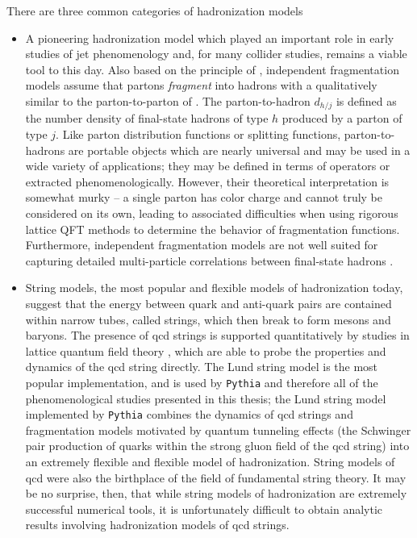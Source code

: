 \begin{subappendices}
There are three common categories of hadronization models
\begin{itemize}
    \item

        A pioneering hadronization model which played an important role in early studies of jet phenomenology and, for many collider studies, remains a viable tool to this day.
        Also based on the principle of , independent fragmentation models assume that partons \textit{fragment} into hadrons with a  qualitatively similar to the \gls{parton-to-parton} of  \cite{Collins:2023cuo,Collins:2011zzd}.
        The \gls{parton-to-hadron} \(d_{h/j}\) is defined as the number density of final-state hadrons of type \(h\) produced by a parton of type \(j\).
        Like parton distribution functions or splitting functions, \glspl{parton-to-hadron} are portable objects which are nearly universal and may be used in a wide variety of applications;
        they may be defined in terms of operators or extracted phenomenologically.
        However, their theoretical interpretation is somewhat murky -- a single parton has color charge and cannot truly be considered on its own, leading to associated difficulties when using rigorous lattice QFT methods to determine the behavior of fragmentation functions.
        Furthermore, independent fragmentation models are not well suited for capturing detailed multi-particle correlations between final-state hadrons \cite{}.


    \item

        String models, the most popular and flexible models of hadronization today, suggest that the energy between quark and anti-quark pairs are contained within narrow tubes, called strings, which then break to form mesons and baryons.
        The presence of \gls{qcd} strings is supported quantitatively by studies in lattice quantum field theory \cite{}, which are able to probe the properties and dynamics of the \gls{qcd} string directly.
        The Lund string model is the most popular implementation, and is used by \texttt{Pythia} \cite{Bierlich:2022pfr} and therefore all of the phenomenological studies presented in this thesis;
        the Lund string model implemented by \texttt{Pythia} combines the dynamics of \gls{qcd} strings and fragmentation models motivated by quantum tunneling effects (the Schwinger pair production of quarks within the strong gluon field of the \gls{qcd} string) into an extremely flexible and flexible model of hadronization.
        String models of \gls{qcd} were also the birthplace of the field of fundamental string theory.
        It may be no surprise, then, that while string models of hadronization are extremely successful numerical tools, it is unfortunately difficult to obtain analytic results involving hadronization models of \gls{qcd} strings.


\end{itemize}
\end{subappendices}
